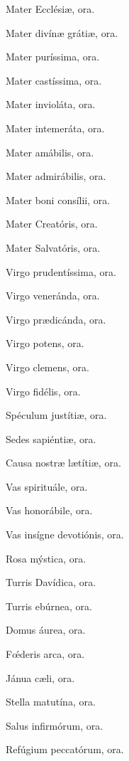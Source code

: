 \noindent Mater Ecclésiæ,  \hfill ora.

\noindent Mater divínæ grátiæ, \hfill ora.

\noindent Mater puríssima, \hfill ora.

\noindent Mater castíssima,   
 \hfill ora.
 
\noindent Mater invioláta,  
\hfill ora.
 
\noindent Mater intemeráta,  \hfill
 ora.
 
\noindent Mater amábilis,  
 \hfill ora.
 
\noindent Mater admirábilis, \hfill
 ora.
 
\noindent Mater boni consílii,  \hfill
 ora.
 
\noindent Mater Creatóris, \hfill
 ora.
 
\noindent Mater Salvatóris, \hfill
 ora.
 
\noindent Virgo prudentíssima, \hfill
 ora.
 
\noindent Virgo veneránda, \hfill   
 ora.
 
\noindent Virgo prædicánda, \hfill  
 ora.
 
\noindent Virgo potens, \hfill
 ora.
 
\noindent Virgo clemens, \hfill  
 ora.
 
\noindent Virgo fidélis, \hfill  
 ora.
 
\noindent Spéculum justítiæ, \hfill  
 ora.
 
\noindent Sedes sapiéntiæ, \hfill  
 ora.
 
\noindent Causa nostræ lætítiæ, \hfill
 ora.
 
\noindent Vas spirituále, \hfill 
 ora.
 
\noindent Vas honorábile, \hfill  
 ora.
 
\noindent Vas insígne devotiónis, \hfill 
 ora.
 
\noindent Rosa mýstica, \hfill  
 ora.
 
\noindent Turris Davídica, \hfill  
 ora.
 
\noindent Turris ebúrnea, \hfill  
 ora.
 
\noindent Domus áurea, \hfill
 ora.
 
\noindent Fœ́deris arca, \hfill
 ora.
 
\noindent Jánua cæli,  \hfill
 ora.
 
\noindent Stella matutína, \hfill  
 ora.
 
\noindent Salus infirmórum, \hfill
 ora.
 
\noindent Refúgium peccatórum, \hfill 
 ora.
 
